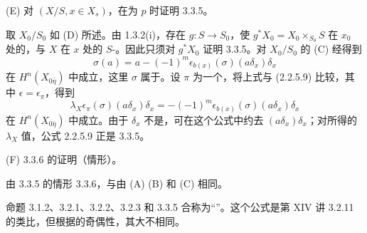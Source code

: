 (E) 对 $(X/S,x\in X_s)$，在为 $p$ 时证明 3.3.5。

取 $X_0/S_0$ 如 (D) 所述。由 1.3.2(i)，存在 $g:S\to S_0$，使 $g^*X_0=X_0\times_{S_0}S$ 在 $x_0$ 处的，与 $X$ 在 $x$ 处的 $S$-。因此只须对 $g^*X_0$ 证明 3.3.5。对 $X_0/S_0$ 的 (C) 经得到
\[
 \sigma(a)=a-(-1)^m\epsilon_{b(x)}(\sigma)(a\delta_x)\delta_x
\]
在 $H^n(X_{0\bar\eta})$ 中成立，这里 $\sigma$ 属于。设 $\pi$ 为一个，将上式与 (2.2.5.9) 比较，其中 $\epsilon=\epsilon_\pi$，得到
\[
 \lambda_X\epsilon_\pi(\sigma)(a\delta_x)\delta_x
 =-(-1)^m\epsilon_{b(x)}(\sigma)(a\delta_x)\delta_x
\]
在 $H^n(X_{0\bar\eta})$ 中成立。由于 $\delta_x$ 不是，可在这个公式中约去 $(a\delta_x)\delta_x$；对所得的 $\lambda_X$ 值，公式 2.2.5.9 正是 3.3.5。

(F) 3.3.6 的证明（情形）。

由 3.3.5 的情形 3.3.6，与由 (A)  (B) 和 (C) 相同。

命题 3.1.2、3.2.1、3.2.2、3.2.3 和 3.3.5 合称为“”。这个公式是第 XIV 讲 3.2.11 的类比，但根据的奇偶性，其大不相同。

